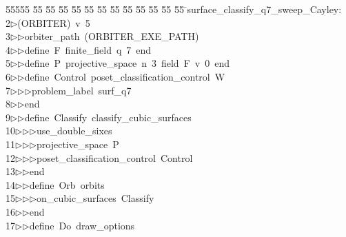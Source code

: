 %
%
\begin{tabbing}
55555 \= 55 \= 55 \= 55 \= 55 \= 55 \= 55 \= 55 \= 55 \= 55 \= 55 \= 55 \= 55 \= \>surface\_classify\_q7\_sweep\_Cayley:\\[0pt]
2\>$\triangleright$\>(ORBITER)\ v\ 5\ \\[0pt]
3\>$\triangleright$\>$\triangleright$\>orbiter\_path\ (ORBITER\_EXE\_PATH)\ \\[0pt]
4\>$\triangleright$\>$\triangleright$\>define\ F\ finite\_field\ q\ 7\ end\ \\[0pt]
5\>$\triangleright$\>$\triangleright$\>define\ P\ projective\_space\ n\ 3\ field\ F\ v\ 0\ end\ \\[0pt]
6\>$\triangleright$\>$\triangleright$\>define\ Control\ poset\_classification\_control\ W\ \\[0pt]
7\>$\triangleright$\>$\triangleright$\>$\triangleright$\>problem\_label\ surf\_q7\ \\[0pt]
8\>$\triangleright$\>$\triangleright$\>end\ \\[0pt]
9\>$\triangleright$\>$\triangleright$\>define\ Classify\ classify\_cubic\_surfaces\ \\[0pt]
10\>$\triangleright$\>$\triangleright$\>$\triangleright$\>use\_double\_sixes\ \\[0pt]
11\>$\triangleright$\>$\triangleright$\>$\triangleright$\>projective\_space\ P\ \\[0pt]
12\>$\triangleright$\>$\triangleright$\>$\triangleright$\>poset\_classification\_control\ Control\ \\[0pt]
13\>$\triangleright$\>$\triangleright$\>end\ \\[0pt]
14\>$\triangleright$\>$\triangleright$\>define\ Orb\ orbits\ \\[0pt]
15\>$\triangleright$\>$\triangleright$\>$\triangleright$\>on\_cubic\_surfaces\ Classify\ \\[0pt]
16\>$\triangleright$\>$\triangleright$\>end\ \\[0pt]
17\>$\triangleright$\>$\triangleright$\>define\ Do\ draw\_options\ \\[0pt]

\end{tabbing}
